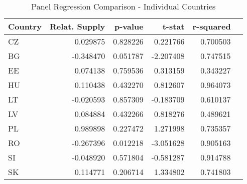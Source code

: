 \documentclass{article}
\begin{document}
\begin{table}[!htbp]
\centering 
\caption{Panel Regression Comparison - Individual Countries}
\label{regression_individual_countries}
\begin{center}


\begin{tabular}{lrrrrr}
\toprule
Country &  Relat. Supply &   p-value &    t-stat &  r-squared \\
\midrule
     CZ &    0.029875 &  0.828226 &  0.221766 &   0.700503 \\
     BG &   -0.348470 &  0.051787 & -2.207408 &   0.747515 \\
     EE &    0.074138 &  0.759536 &  0.313159 &   0.343227 \\
     HU &    0.110438 &  0.432270 &  0.812607 &   0.964073 \\
     LT &   -0.020593 &  0.857309 & -0.183709 &   0.610137 \\
     LV &    0.084884 &  0.432266 &  0.818276 &   0.489621 \\
     PL &    0.989898 &  0.227472 &  1.271998 &   0.735357 \\
     RO &   -0.267396 &  0.012218 & -3.051628 &   0.905163 \\
     SI &   -0.048920 &  0.571804 & -0.581287 &   0.914788 \\
     SK &    0.114771 &  0.206714 &  1.334802 &   0.741803 \\
\bottomrule
\end{tabular}

\end{center}
\end{table}
\end{document}
